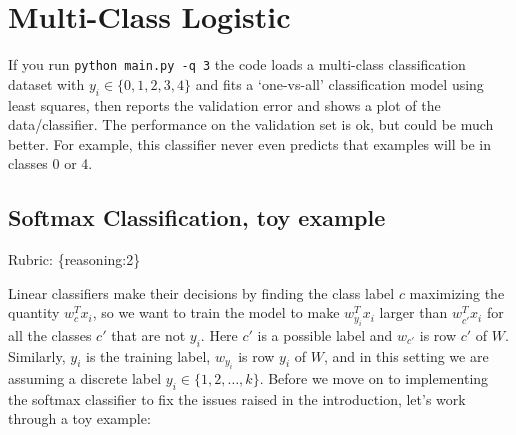 \documentclass{article}
\def\rubric#1{\gre{Rubric: \{#1\}}}{}
\def\gre#1{{\color{gre}#1}}
\begin{document}
\section{Multi-Class Logistic}

If you run \verb|python main.py -q 3| the code loads a multi-class
classification dataset with $y_i \in \{0,1,2,3,4\}$ and fits a `one-vs-all' classification
model using least squares, then reports the validation error and shows a plot of the data/classifier.
The performance on the validation set is ok, but could be much better.
For example, this classifier never even predicts that examples will be in classes 0 or 4.


\subsection{Softmax Classification, toy example}
\rubric{reasoning:2}

Linear classifiers make their decisions by finding the class label $c$ maximizing the quantity $w_c^Tx_i$, so we want to train the model to make $w_{y_i}^Tx_i$ larger than $w_{c'}^Tx_i$ for all the classes $c'$ that are not $y_i$.
Here $c'$ is a possible label and $w_{c'}$ is row $c'$ of $W$. Similarly, $y_i$ is the training label, $w_{y_i}$ is row $y_i$ of $W$, and in this setting we are assuming a discrete label $y_i \in \{1,2,\dots,k\}$. Before we move on to implementing the softmax classifier to fix the issues raised in the introduction, let's work through a toy example:
\end{document}
